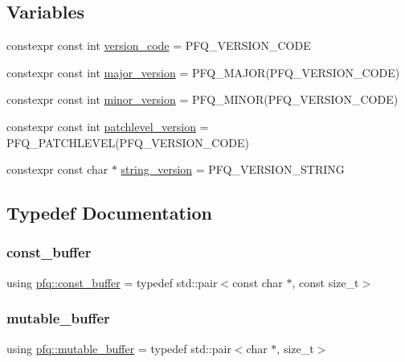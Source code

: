 \subsection*{Variables}
\begin{DoxyCompactItemize}
\item 
constexpr const int \hyperlink{namespacepfq_a7a40dd66aee22cafaf240382a6d965ab}{version\+\_\+code} = P\+F\+Q\+\_\+\+V\+E\+R\+S\+I\+O\+N\+\_\+\+C\+O\+DE
\item 
constexpr const int \hyperlink{namespacepfq_a5edeb73b0430a772b181d778b1c90bbc}{major\+\_\+version} = P\+F\+Q\+\_\+\+M\+A\+J\+OR(P\+F\+Q\+\_\+\+V\+E\+R\+S\+I\+O\+N\+\_\+\+C\+O\+DE)
\item 
constexpr const int \hyperlink{namespacepfq_a7f444700f822d8632dee37560ab76a7b}{minor\+\_\+version} = P\+F\+Q\+\_\+\+M\+I\+N\+OR(P\+F\+Q\+\_\+\+V\+E\+R\+S\+I\+O\+N\+\_\+\+C\+O\+DE)
\item 
constexpr const int \hyperlink{namespacepfq_aa1b1daa6a96155899c26c206325e97a9}{patchlevel\+\_\+version} = P\+F\+Q\+\_\+\+P\+A\+T\+C\+H\+L\+E\+V\+EL(P\+F\+Q\+\_\+\+V\+E\+R\+S\+I\+O\+N\+\_\+\+C\+O\+DE)
\item 
constexpr const char $\ast$ \hyperlink{namespacepfq_a30c944a281046dafc6e1cd2629cc6e15}{string\+\_\+version} = P\+F\+Q\+\_\+\+V\+E\+R\+S\+I\+O\+N\+\_\+\+S\+T\+R\+I\+NG
\end{DoxyCompactItemize}


\subsection{Typedef Documentation}
\mbox{\label{namespacepfq_ac835a1bd09b4cbaba61c100b50d0a99f}} 
\subsubsection{\texorpdfstring{const\+\_\+buffer}{const\_buffer}}
{\footnotesize\ttfamily using \hyperlink{namespacepfq_ac835a1bd09b4cbaba61c100b50d0a99f}{pfq\+::const\+\_\+buffer} = typedef std\+::pair$<$const char $\ast$, const size\+\_\+t$>$}

\mbox{\label{namespacepfq_ad7b88920eaf729154354741132483ea8}} 
\subsubsection{\texorpdfstring{mutable\+\_\+buffer}{mutable\_buffer}}
{\footnotesize\ttfamily using \hyperlink{namespacepfq_ad7b88920eaf729154354741132483ea8}{pfq\+::mutable\+\_\+buffer} = typedef std\+::pair$<$char $\ast$, size\+\_\+t$>$}



